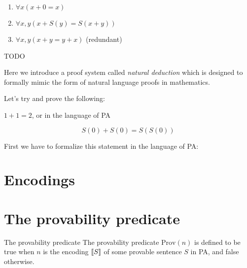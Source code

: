 \documentclass[10pt]{article}
\DeclarePairedDelimiter{\enc}{[\![}{]\!]}
\newcommand{\type}[1]{\texttt{#1}}
\newcommand{\prov}{\text{Prov}}
\begin{document}
	\begin{tcolorbox}[colback=green!5!white,colframe=green!75!black,title={\bf Addition axioms}]
		\begin{enumerate}[label=A.\arabic*]
			\item $\forall x (x+0 = x)$ \label{ax:add-id}
			\item $\forall x, y (x+S(y) = S(x+y))$ \label{ax:add-succ}
			\item $\forall x, y (x+y=y+x)$ (redundant) \label{ax:add-sym}
		\end{enumerate}
	\end{tcolorbox}
	
	\begin{tcolorbox}[colback=green!5!white,colframe=green!75!black,title={\bf Multiplication axioms}]
		
	\end{tcolorbox}
	
	\begin{tcolorbox}[colback=green!5!white,colframe=green!75!black,title={\bf Inequality axioms}]
		TODO
	\end{tcolorbox}
	
	
	Here we introduce a proof system called \emph{natural deduction} which is designed to formally mimic the form of natural language proofs in mathematics.
	
	Let's try and prove the following:
	
	\begin{theorem}{}{}
		$1 + 1 = 2$, or in the language of PA
		
		$$S(0) + S(0) = S(S(0))$$
	\end{theorem}
	
	\noindent
	First we have to formalize this statement in the language of PA:
	
	\section{Encodings}
	\section{The provability predicate}
	
	\begin{definition}{The provability predicate}{}
		The provability predicate $\prov(n)$ is defined to be true when $n$ is the encoding $\enc{S}$ of some provable sentence $S$ in PA, and false otherwise.
	\end{definition}
	
\end{document}

